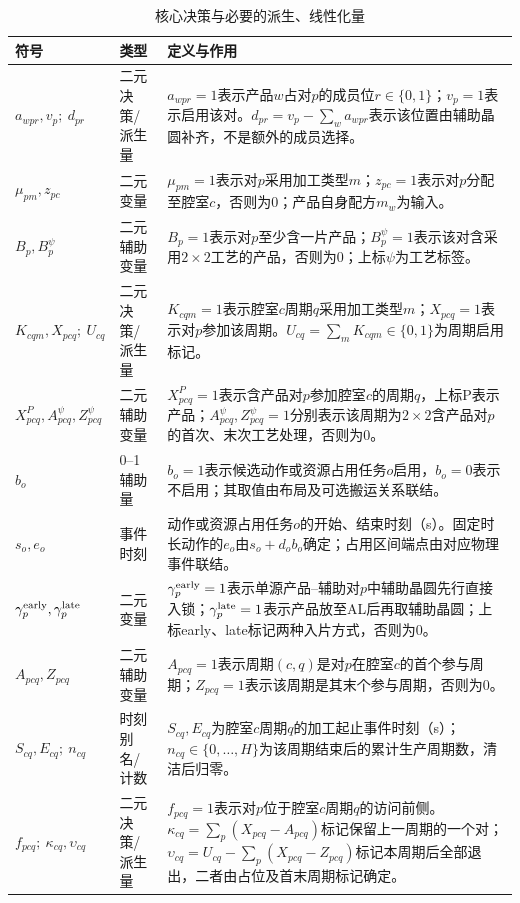 \documentclass[final,5p,times,twocolumn]{elsarticle}
\begin{document}
\begin{table}[!t]
\centering
\scriptsize
\setlength{\tabcolsep}{3pt}
\caption{核心决策与必要的派生、线性化量}
\label{tab:symbol-cn-b}
\begin{tabular}{C{0.23\textwidth}C{0.10\textwidth}C{0.61\textwidth}}
\toprule
符号 & 类型 & 定义与作用 \\
\midrule
$a_{wpr},v_p;\ d_{pr}$ & 二元决策/派生量 & $a_{wpr}=1$表示产品$w$占对$p$的成员位$r\in\{0,1\}$；$v_p=1$表示启用该对。$d_{pr}=v_p-\sum_w a_{wpr}$表示该位置由辅助晶圆补齐，不是额外的成员选择。\\
$\mu_{pm},z_{pc}$ & 二元变量 & $\mu_{pm}=1$表示对$p$采用加工类型$m$；$z_{pc}=1$表示对$p$分配至腔室$c$，否则为0；产品自身配方$m_w$为输入。\\
$B_p,B_p^{\psi}$ & 二元辅助变量 & $B_p=1$表示对$p$至少含一片产品；$B_p^{\psi}=1$表示该对含采用$2\times2$工艺的产品，否则为0；上标$\psi$为工艺标签。\\
$K_{cqm},X_{pcq};\ U_{cq}$ & 二元决策/派生量 & $K_{cqm}=1$表示腔室$c$周期$q$采用加工类型$m$；$X_{pcq}=1$表示对$p$参加该周期。$U_{cq}=\sum_mK_{cqm}\in\{0,1\}$为周期启用标记。\\
$X^P_{pcq},A^{\psi}_{pcq},Z^{\psi}_{pcq}$ & 二元辅助变量 & $X^P_{pcq}=1$表示含产品对$p$参加腔室$c$的周期$q$，上标P表示产品；$A^{\psi}_{pcq},Z^{\psi}_{pcq}=1$分别表示该周期为$2\times2$含产品对$p$的首次、末次工艺处理，否则为0。\\
$b_o$ & 0--1辅助量 & $b_o=1$表示候选动作或资源占用任务$o$启用，$b_o=0$表示不启用；其取值由布局及可选搬运关系联结。\\
$s_o,e_o$ & 事件时刻 & 动作或资源占用任务$o$的开始、结束时刻（s）。固定时长动作的$e_o$由$s_o+d_ob_o$确定；占用区间端点由对应物理事件联结。\\
$\gamma^{\rm early}_p,\gamma^{\rm late}_p$ & 二元变量 & $\gamma^{\rm early}_p=1$表示单源产品--辅助对$p$中辅助晶圆先行直接入锁；$\gamma^{\rm late}_p=1$表示产品放至AL后再取辅助晶圆；上标early、late标记两种入片方式，否则为0。\\
$A_{pcq},Z_{pcq}$ & 二元辅助变量 & $A_{pcq}=1$表示周期$(c,q)$是对$p$在腔室$c$的首个参与周期；$Z_{pcq}=1$表示该周期是其末个参与周期，否则为0。\\
$S_{cq},E_{cq};\ n_{cq}$ & 时刻别名/计数 & $S_{cq},E_{cq}$为腔室$c$周期$q$的加工起止事件时刻（s）；$n_{cq}\in\{0,\ldots,H\}$为该周期结束后的累计生产周期数，清洁后归零。\\
$f_{pcq};\ \kappa_{cq},\upsilon_{cq}$ & 二元决策/派生量 & $f_{pcq}=1$表示对$p$位于腔室$c$周期$q$的访问前侧。$\kappa_{cq}=\sum_p(X_{pcq}-A_{pcq})$标记保留上一周期的一个对；$\upsilon_{cq}=U_{cq}-\sum_p(X_{pcq}-Z_{pcq})$标记本周期后全部退出，二者由占位及首末周期标记确定。\\

\end{tabular}
\end{table}
\end{document}

